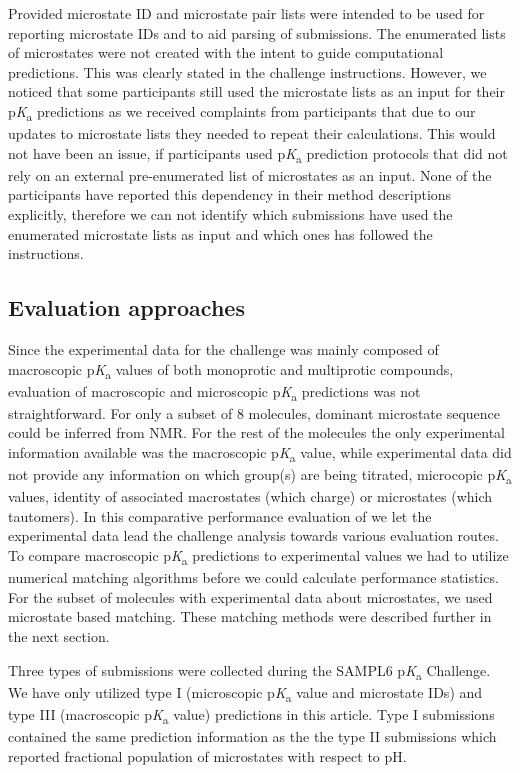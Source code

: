\documentclass[9pt,lineno,final]{elife}
\newcommand{\pKa}{p\textit{K}\textsubscript{a}}
\begin{document}
Provided microstate ID and microstate pair lists were intended to be used for reporting microstate IDs and to aid parsing of submissions. 
The enumerated lists of microstates were not created with the intent to guide computational predictions. 
This was clearly stated in the challenge instructions. 
However, we noticed that some participants still used the microstate lists as an input for their \pKa{} predictions as we received complaints from participants that due to our updates to microstate lists they needed to repeat their calculations. 
This would not have been an issue, if participants used \pKa{} prediction protocols that did not rely on an external pre-enumerated list of microstates as an input.
None of the participants have reported this dependency in their method descriptions explicitly, therefore we can not identify which submissions have used the enumerated microstate lists as input and which ones has followed the instructions.




\subsection{Evaluation approaches}

Since the experimental data for the challenge was mainly composed of macroscopic \pKa{} values of both monoprotic and multiprotic compounds, evaluation of macroscopic and microscopic \pKa{} predictions was not straightforward. For only a subset of 8 molecules, dominant microstate sequence could be inferred from NMR. For the rest of the molecules the only experimental information available was the macroscopic \pKa{} value, while experimental data did not provide any information on which group(s) are being titrated, microcopic \pKa{} values, identity of associated macrostates (which charge) or  microstates (which tautomers). In this comparative performance evaluation of we let the experimental data lead the challenge analysis towards various evaluation routes. To compare macroscopic \pKa{} predictions to experimental values we had to utilize numerical matching algorithms before we could calculate performance statistics. For the subset of molecules with experimental data about microstates, we used microstate  based matching. These matching methods were described further in the next section.

Three types of submissions were collected during the SAMPL6 \pKa{} Challenge. We have only utilized type I (microscopic \pKa{} value and microstate IDs) and type III (macroscopic \pKa{} value) predictions in this article. Type I submissions contained the same prediction information as the the type II submissions which reported fractional population of microstates with respect to pH.
\end{document}
